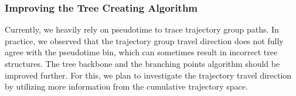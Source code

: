 \subsubsection{Improving the Tree Creating Algorithm}
Currently, we heavily rely on pseudotime to trace trajectory group paths. In practice, we observed that the trajectory group travel direction does not fully agree with the pseudotime bin, which can sometimes result in incorrect tree structures. The tree backbone and the branching points algorithm should be improved further. For this, we plan to investigate the trajectory travel direction by utilizing more information from the cumulative trajectory space.

